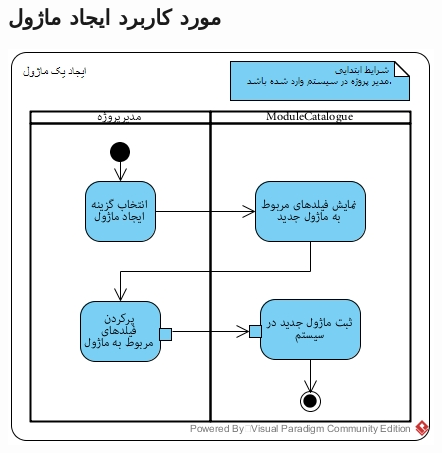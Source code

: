 \subsection*{مورد کاربرد ایجاد ماژول}
\vspace{2cm}
\begin{center}
\includegraphics[width=\textwidth]{ActivityDiagramsWithSwimlanes/27.jpg}
\end{center}


\newpage
\vspace{2cm}
